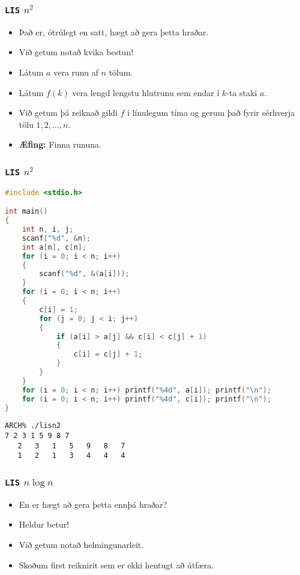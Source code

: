 \documentclass{beamer}
\begin{document}
\begin{frame}
	\frametitle{\texttt{LIS} $n^2$}
	\begin{itemize}
		\item<1-> Það er, ótrúlegt en satt, hægt að gera þetta hraðar.
		\item<2-> Við getum notað kvika bestun!
		\item<3-> Látum $a$ vera runu af $n$ tölum.
		\item<4-> Látum $f(k)$ vera lengd lengstu hlutrunu sem endar í $k$-ta staki $a$.
		\item<5-> Við getum þá reiknað gildi $f$ í línulegum tíma og gerum það fyrir sérhverja tölu $1, 2, ..., n$.
		\item<6-> {\bf Æfing:} Finna rununa.
	\end{itemize}
\end{frame}

\begin{frame}[fragile]
	\frametitle{\texttt{LIS} $n^2$}
	\tiny
	\begin{lstlisting}[language=C]
#include <stdio.h>

int main()
{
	int n, i, j;
	scanf("%d", &n);
	int a[n], c[n];
	for (i = 0; i < n; i++)
	{
		scanf("%d", &(a[i]));
	}
	for (i = 0; i < n; i++)
	{
		c[i] = 1;
		for (j = 0; j < i; j++)
		{
			if (a[i] > a[j] && c[i] < c[j] + 1)
			{
				c[i] = c[j] + 1;
			}
		}
	}
	for (i = 0; i < n; i++) printf("%4d", a[i]); printf("\n");
	for (i = 0; i < n; i++) printf("%4d", c[i]); printf("\n");
}
\end{lstlisting}
\begin{verbatim}
ARCH% ./lisn2
7 2 3 1 5 9 8 7
   2   3   1   5   9   8   7
   1   2   1   3   4   4   4
\end{verbatim}
\end{frame}

\begin{frame}
	\frametitle{\texttt{LIS} $n\log n$}
	\begin{itemize}
		\item<1-> En er hægt að gera þetta ennþá hraðar?
		\item<2-> Heldur betur!
		\item<3-> Við getum notað helmingunarleit.
		\item<4-> Skoðum first reiknirit sem er ekki hentugt að útfæra.
	\end{itemize}
\end{frame}
\end{document}

